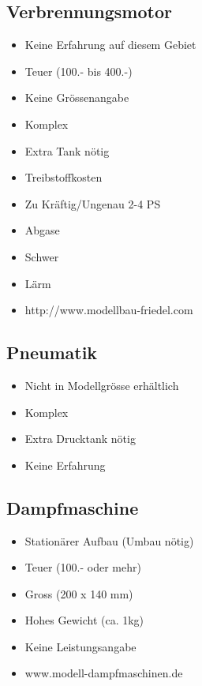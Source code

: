 \subsection{Verbrennungsmotor}
\begin{itemize}
\item Keine Erfahrung auf diesem Gebiet
\item Teuer (100.- bis 400.-)
\item Keine Grössenangabe
\item Komplex
\item Extra Tank nötig
\item Treibstoffkosten
\item Zu Kräftig/Ungenau 2-4 PS
\item Abgase
\item Schwer
\item Lärm
\item http://www.modellbau-friedel.com
\end{itemize}

\subsection{Pneumatik}
\begin{itemize}
\item Nicht in Modellgrösse erhältlich
\item Komplex
\item Extra Drucktank nötig
\item Keine Erfahrung
\end{itemize}

\subsection{Dampfmaschine}
\begin{itemize}
\item Stationärer Aufbau (Umbau nötig)
\item Teuer (100.- oder mehr)
\item Gross (200 x 140 mm)
\item Hohes Gewicht (ca. 1kg)
\item Keine Leistungsangabe
\item www.modell-dampfmaschinen.de
\end{itemize}
